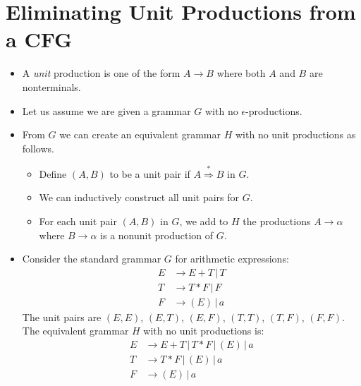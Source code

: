 \documentclass[]{article}
\begin{document}
\section{Eliminating Unit Productions from a CFG}
  \begin{itemize}
    \item A \emph{unit} production is one of the form $A \rightarrow B$ where 
    both $A$ and $B$ are nonterminals.
    \item Let us assume we are given a grammar $G$ with no 
    $\epsilon$-productions.
    \item From $G$ we can create an equivalent grammar $H$ with no unit 
    productions as follows.
      \begin{itemize}
        \item Define $(A, B)$ to be a unit pair if $A \overset{*}{\Rightarrow} 
        B$ in $G$.
        \item We can inductively construct all unit pairs for $G$.
        \item For each unit pair $(A,B)$ in $G$, we add to $H$ the productions 
        $A \rightarrow \alpha$ where $B \rightarrow \alpha$ is a nonunit 
        production of $G$.
      \end{itemize}
    \item Consider the standard grammar $G$ for arithmetic expressions:
      \begin{align*}
        E &\rightarrow E + T \, | \, T \\
        T &\rightarrow T * F \, | \, F \\
        F &\rightarrow ( E ) \, | \, a
      \end{align*}
    The unit pairs are $(E,E)$, $(E,T)$, $(E,F)$, $(T,T)$, $(T,F)$, $(F,F)$. \\
    The equivalent grammar $H$ with no unit productions is:
      \begin{align*}
        E &\rightarrow E + T \, | \, T * F \, | \, ( E ) \, | \, a \\
        T &\rightarrow T * F \, | \, ( E ) \, | \, a               \\
        F &\rightarrow ( E ) \, | \, a                             \\
      \end{align*}
  \end{itemize}
  
\end{document}
